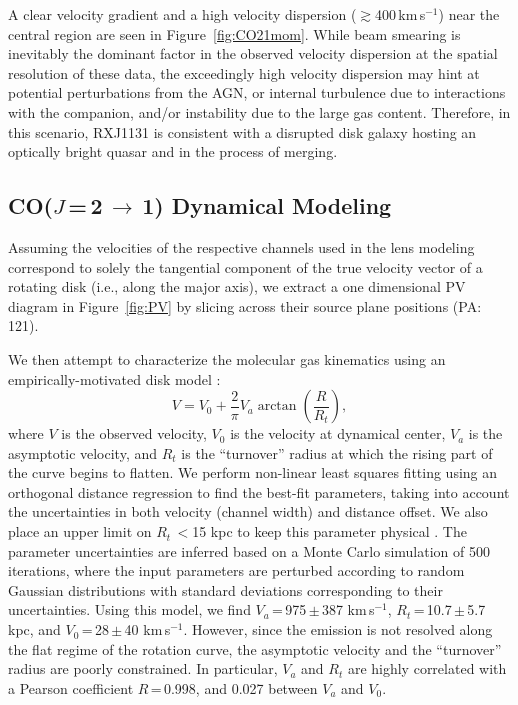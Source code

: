 \documentclass[]{emulateapj}
\newcommand{\rarr}{$\rightarrow$}
\newcommand{\bco}{\mbox{CO($J$\,=\,2\,\rarr\,1)}\xspace}
\newcommand{\kms}{\mbox{km\,s$^{-1}$}\xspace}
\newcommand{\eg}{{e.g.,~}}
\newcommand{\Fig}[1]{Figure~\ref{fig:#1}}
\begin{document}
A clear velocity gradient and a high
velocity dispersion ($\gtrsim$400\,\kms) near the central region
are seen in \Fig{CO21mom}. While beam smearing is inevitably the
dominant factor in the observed velocity dispersion
at the spatial resolution of these data, the exceedingly
high velocity dispersion may hint
at potential perturbations from the AGN, or internal turbulence due to
interactions with the companion, and/or instability due to the large gas
content.
Therefore, in this scenario, RXJ1131 is
consistent with a disrupted disk galaxy hosting an optically
bright quasar and in the process of merging.

\subsection{\bco Dynamical Modeling} \label{sec:dynamics}
Assuming the velocities of the respective channels used in the
lens modeling correspond to solely the tangential component of the
true velocity vector of a rotating disk (i.e., along the major axis),
we extract a one dimensional PV diagram in \Fig{PV}
by slicing across their source plane positions (PA: 121\degr).

We then attempt to characterize the molecular gas kinematics using an
empirically-motivated disk model \citep[\eg][]{Courteau97a,Puech08a,Miller11a}:
\begin{equation}
V = V_0 + \frac{2}{\pi} V_{a} \arctan(\frac{R}{R_{t}}),
\end{equation}
where $V$ is the observed velocity, $V_0$ is the velocity at dynamical center,
$V_{a}$ is the asymptotic velocity, and $R_{t}$ is the ``turnover''
radius at which the rising part of the curve begins to flatten.
We perform non-linear least squares fitting using an orthogonal distance
regression to find the best-fit parameters,
taking into account the uncertainties in both velocity (channel width) and
distance offset. We also place an upper limit on $R_{t}$\,$<$15 kpc
to keep this parameter physical \citep[\eg][]{Puech08a,Miller11a}.
The parameter uncertainties are inferred based on a Monte Carlo simulation
of 500 iterations, where the input parameters are perturbed
according to random Gaussian distributions with standard deviations
corresponding to their uncertainties.
Using this model, we find $V_{a}$\,=\,975\,$\pm$\,387 \kms,
$R_{t}$\,=\,10.7\,$\pm$\,5.7\,kpc, and $V_0$\,=\,28\,$\pm$\,40 \kms.
However, since the emission is not resolved along the flat regime
of the rotation curve, the asymptotic velocity
and the ``turnover'' radius are poorly constrained.
In particular, $V_{a}$ and $R_{t}$ are highly correlated with a
Pearson coefficient $R$\,=\,0.998, and 0.027 between $V_{a}$ and $V_0$.
\end{document}
